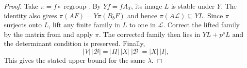 \begin{proof}
Take $\pi=f\circ\operatorname{regroup}$. By $Yf=fA_T$, its image $L$ is stable under $Y$. The identity also gives $\pi(AF)=Y\pi(B_bF)$ and hence $\pi(A\mathcal L)\subseteq YL$. Since $\pi$ surjects onto $L$, lift any finite family in $L$ to one in $\mathcal L$. Correct the lifted family by the matrix from  and apply $\pi$. The corrected family then lies in $YL+p^sL$ and the determinant condition is preserved. Finally,
\[
 |V|\,|\mathcal B|=|H|\,|X|\,|\mathcal B|=|X|\,|I|,
\]
This gives the stated upper bound for the same $\lambda$.
\end{proof}

